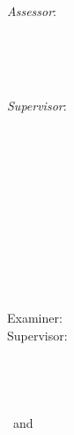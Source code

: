 \begin{titlepage}
	\begin{minipage}{.4\textwidth}
		\begin{flushleft}
			\textit{Assessor}: \\
			{\Large \textsc{\thesisFirstReviewer}} \\
			{\small \textsc{\thesisFirstReviewerDepartment}} \\[-1mm]
			{\small \textsc{\thesisFirstReviewerUniversity}}
		\end{flushleft}
	\end{minipage} %
	~
	\begin{minipage}{.4\textwidth}
		\begin{flushright}
		\textit{Supervisor}: \\
		{\Large \textsc{\thesisFirstSupervisor}} \\
		{\small \textsc{\thesisFirstSupervisorDepartment}} \\[-1mm]
		{\small \textsc{\thesisFirstSupervisorUniversity}}
		\end{flushright}
	\end{minipage} 
	\\[10mm]

	\vfill\vfill
	
	\textsc{\thesisUniversityInstitute} \\
	\textit{\thesisUniversityGroup} \\
	
	

\end{titlepage}


\hfill
\vfill
{
	\small
	\textbf{\thesisName} \\
	\textit{\thesisTitle} \\
	\thesisSubject \\
	\thesisDate \\
	Examiner: \thesisFirstReviewer\\
	Supervisor: \thesisFirstSupervisor \\[1.5em]
	\textbf{\thesisUniversity} \\
	\textit{\thesisUniversityGroup} \\
	\thesisUniversityInstitute \\
	\thesisUniversityStreetAddress \\
	\thesisUniversityPostalCode\ and \thesisUniversityCity
}
